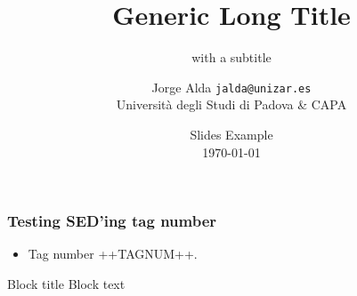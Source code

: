 \documentclass[mathserif, 10pt, aspectratio=169]{beamer}
\title[Generic title]{Generic Long Title}
\subtitle{with a subtitle}
\author[Jorge Alda]{Jorge Alda \hspace{4em} \texttt{jalda@unizar.es} \\
Università degli Studi di Padova \& CAPA}
\date[Slides exapmle]{Slides Example \\ \today}
\begin{document}
\begin{frame}

\titlepage

\end{frame}



\begin{frame}
\frametitle{Testing SED'ing tag number}
\begin{itemize}
\item Tag \alert{number} ++TAGNUM++.
\end{itemize}

\begin{block}{Block title}
    Block text
\end{block}


\end{frame}
\end{document}

